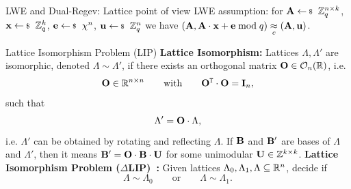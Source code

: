 \documentclass[xcolor=table,10pt,aspectratio=169]{beamer}
\begin{document}
\begin{frame}{LWE and Dual-Regev: Lattice point of view}
  LWE assumption: for \(\mat{A} \sample \ZZ_q^{n \times k}\), \(\vec{x} \sample \ZZ_q^k\), \(\vec{e} \sample \chi^n\), \(\vec{u} \sample \ZZ_q^n\) we have \(\left(\mathbf{A}, \mathbf{A} \cdot \mathbf{x} + \mathbf{e} \bmod q\right) \underset{c}{\approx} \left(\mathbf{A}, \mathbf{u} \right)\).

\end{frame}

\begin{frame}{Lattice Isomorphism Problem (LIP)}
  \textbf{Lattice Isomorphism:}
    Lattices \(\Lambda, \Lambda'\) are isomorphic, denoted \(\Lambda \sim \Lambda'\),
    if there exists an orthogonal matrix \(\mathbf{O} \in \mathcal{O}_n(\mathbb{R})\), i.e. 
    \[
      \mathbf{O} \in \mathbb{R}^{n \times n} \qquad\text{with}\qquad \mathbf{O}^{\mathtt{T}} \cdot \mathbf{O} = \mathbf{I}_n,
    \]
    such that 
    \[
      \Lambda' = \mathbf{O} \cdot \Lambda,
    \]
    i.e. \(\Lambda'\) can be obtained by rotating and reflecting \(\Lambda\). If \(\mathbf{B}\) and \(\mathbf{B}'\) are bases of \(\Lambda\) and \(\Lambda'\), then it means \(\mathbf{B}' = \mathbf{O} \cdot \mathbf{B} \cdot \mathbf{U}\) for some unimodular \(\mathbf{U} \in \mathbb{Z}^{k \times k}\).
  \vfill
  \pause
  \textbf{Lattice Isomorphism Problem (\(\Delta\)LIP)~\cite{EC:DucvWo22}:}
    Given lattices \(\Lambda_0, \Lambda_1, \Lambda \subseteq \mathbb{R}^n\), decide if
    \[
      \Lambda \sim \Lambda_0 \qquad\text{or}\qquad \Lambda \sim \Lambda_1.
    \]
\end{frame}
\end{document}
